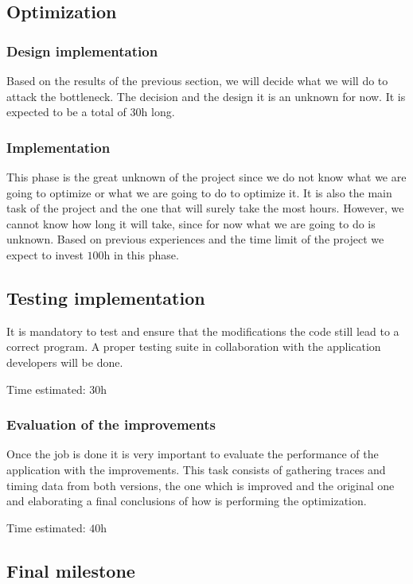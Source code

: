 \subsection{Optimization}
\subsubsection{Design implementation}
\justify
Based on the results of the previous section, we will decide what we will do to attack the bottleneck. The decision and the design it is an unknown for now. It is expected to be a total of $\si{30\hour}$ long.

\subsubsection{Implementation}
\justify
This phase is the great unknown of the project since we do not know what we are going to optimize or what we are going to do to optimize it. It is also the main task of the project and the one that will surely take the most hours. However, we cannot know how long it will take, since for now what we are going to do is unknown. Based on previous experiences and the time limit of the project we expect to invest $\si{100\hour}$ in this phase.

\subsection{Testing implementation}
\justify
It is mandatory to test and ensure that the modifications the code still lead to a correct program. A proper testing suite in collaboration with the application developers will be done.

\justify
Time estimated: $\si{30\hour}$

\subsubsection{Evaluation of the improvements}
\justify
Once the job is done it is very important to evaluate the performance of the application with the improvements. This task consists of gathering traces and timing data from both versions, the one which is improved and the original one and elaborating a final conclusions of how is performing the optimization.

\justify
Time estimated: $\si{40\hour}$


\subsection{Final milestone}

